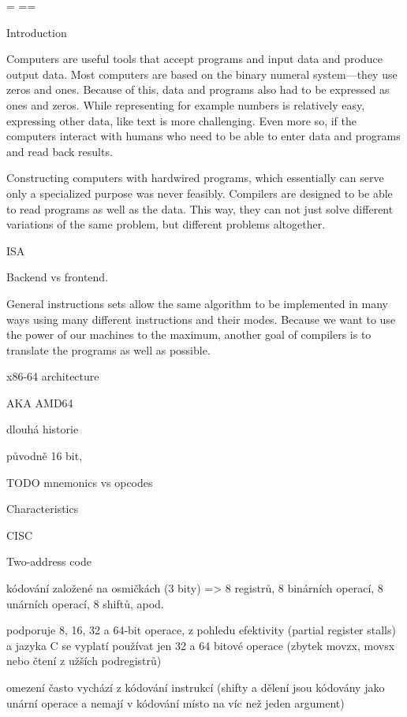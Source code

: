 {\nopagenumbers
  {\pgbackground={
    \picwidth=\pagewidth \picheight=\pageheight
    }
    \null\vfil\break}
  \null\vfil\break}
\makefront

\chap Introduction

Computers are useful tools that accept programs and input data and produce
output data. Most computers are based on the binary numeral system---they use zeros
and ones. Because of this, data and programs also had to be expressed as ones
and zeros. While representing for example numbers is relatively easy, expressing
other data, like text is more challenging. Even more so, if the computers
interact with humans who need to be able to enter data and programs and read
back results.

Constructing computers with hardwired programs, which essentially can serve only
a specialized purpose was never feasibly. Compilers are designed to be able to
read programs as well as the data. This way, they can not just solve different
variations of the same problem, but different problems altogether.

ISA

Backend vs frontend.

General instructions sets allow the same algorithm to be implemented in many
ways using many different instructions and their modes. Because we want to use
the power of our machines to the maximum, another goal of compilers is to
translate the programs as well as possible.


\chap x86-64 architecture

AKA AMD64

dlouhá historie

původně 16 bit,

TODO mnemonics vs opcodes

\sec Characteristics

CISC

Two-address code

kódování založené na osmičkách (3 bity) => 8 registrů, 8 binárních operací, 8
unárních operací, 8 shiftů, apod.

podporuje 8, 16, 32 a 64-bit operace, z pohledu efektivity (partial register
stalls) a jazyka C se vyplatí používat jen 32 a 64 bitové operace (zbytek movzx,
movsx nebo čtení z užších podregistrů)

omezení často vychází z kódování instrukcí (shifty a dělení jsou kódovány jako unární operace
a nemají v kódování místo na víc než jeden argument)


